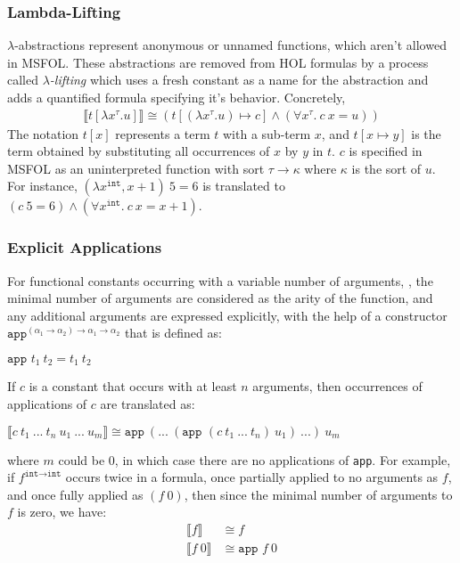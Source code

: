 \documentclass{article}
\begin{document}
	\subsubsection{Lambda-Lifting}
		$\lambda$-abstractions represent 
		anonymous or unnamed functions, 
		which aren't allowed in MSFOL.
		These abstractions are removed
		from HOL formulas by a process 
		called \textit{$\lambda$-lifting}
		which uses a fresh constant as a
		name for the abstraction and adds 
		a quantified formula specifying 
		it's behavior. Concretely,
		\begin{align*}
			\llbracket t[\lambda x^{\tau}.u]
			\rrbracket \cong 
			(t[(\lambda x^{\tau}.u) \mapsto c]
			\land (\forall x^{\tau}.\ c\ x = u))
		\end{align*}
		The notation $t[x]$ represents a 
		term $t$ with a sub-term $x$, 
		and $t[x \mapsto y]$ is the 
		term obtained by substituting all 
		occurrences of $x$ by $y$ in $t$.
		$c$ is specified in MSFOL as an 
		uninterpreted function with sort 
		$\tau \to \kappa$ where $\kappa$ 
		is the sort of $u$. For instance, 
		$(\lambda x^{\texttt{int}}, x + 1)\ 
		5 = 6$
		is translated to $(c\ 5 = 6) \land
		(\forall x^{\texttt{int}}.\ 
		c\ x = x + 1)$.
		
	\subsubsection{Explicit Applications}
		For functional constants occurring 
		with a variable number of arguments, 
		\cite{bohme}, the minimal 
		number of arguments are 
		considered as the arity of the 
		function, and any additional 
		arguments are expressed 
		explicitly, with the help of a 
		constructor 
		$\texttt{app}^{(\alpha_1 \to 
		\alpha_2) \to \alpha_1 \to 
		\alpha_2}$ that is defined as:
		\begin{center}
			$\texttt{app }t_1\ t_2 = 
			t_1\ t_2$
		\end{center}
		If $c$ is a constant that 
		occurs with at least $n$
		arguments, then 
		occurrences of applications 
		of $c$ are translated as:
		\begin{center}
			$\llbracket c\ t_1\ ...\ t_n
			\ u_1\ ...\ u_m \rrbracket
			\cong \texttt{app}\ (...\ 
			(\texttt{app }(c\ t_1\ 
			...\ t_n)\ u_1)	\ ...)\ u_m$
		\end{center}
		where $m$ could be $0$, in which 
		case there are no applications 
		of \texttt{app}. For example, if 
		$f^{\texttt{int} \to \texttt{int}}$ 
		occurs twice in a formula, once 
		partially applied to no arguments 
		as $f$, and once fully applied as 
		$(f\ 0)$, then since the minimal 
		number of arguments to $f$ is 
		zero, we have:
		\begin{align*}
		\llbracket f \rrbracket &\cong
		f\\
		\llbracket f\ 0 \rrbracket &\cong
		\texttt{app } f\ 0
		\end{align*}
		
\end{document}
